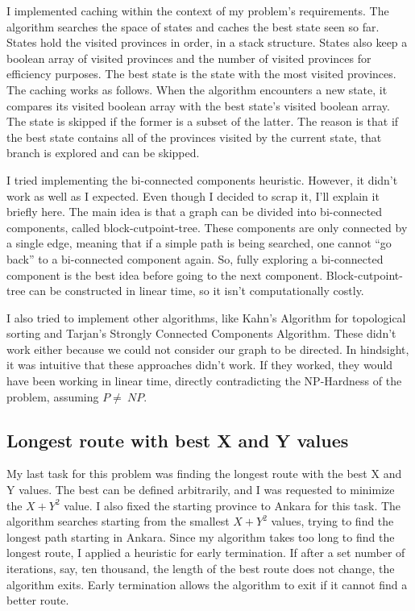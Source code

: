 \documentclass[12pt,a4paper]{article}
\begin{document}
I implemented caching within the context of my problem's requirements. The
algorithm searches the space of states and caches the best state seen so far.
States hold the visited provinces in order, in a stack structure. States also
keep a boolean array of visited provinces and the number of visited provinces
for efficiency purposes. The best state is the state with the most visited
provinces. The caching works as follows. When the algorithm encounters a new
state, it compares its visited boolean array with the best state's visited
boolean array. The state is skipped if the former is a subset of the latter. The
reason is that if the best state contains all of the provinces visited by the
current state, that branch is explored and can be skipped.

I tried implementing the bi-connected components heuristic. However, it didn't
work as well as I expected. Even though I decided to scrap it, I'll explain it
briefly here. The main idea is that a graph can be divided into bi-connected
components, called block-cutpoint-tree. These components are only connected by a
single edge, meaning that if a simple path is being searched, one cannot ``go
back'' to a bi-connected component again. So, fully exploring a bi-connected
component is the best idea before going to the next component.
Block-cutpoint-tree can be constructed in linear time, so it isn't
computationally costly.

I also tried to implement other algorithms, like Kahn's Algorithm for
topological sorting and Tarjan's Strongly Connected Components Algorithm. These
didn't work either because we could not consider our graph to be directed. In
hindsight, it was intuitive that these approaches didn't work. If they worked,
they would have been working in linear time, directly contradicting the
NP-Hardness of the problem, assuming \(P \neq\ NP\).

\subsection{Longest route with best X and Y values}

My last task for this problem was finding the longest route with the best X and
Y values. The best can be defined arbitrarily, and I was requested to minimize
the \(X + Y^2\) value. I also fixed the starting province to Ankara for this
task. The algorithm searches starting from the smallest \(X + Y^2\) values,
trying to find the longest path starting in Ankara. Since my algorithm takes too
long to find the longest route, I applied a heuristic for early termination. If
after a set number of iterations, say, ten thousand, the length of the best
route does not change, the algorithm exits. Early termination allows the
algorithm to exit if it cannot find a better route.
\end{document}
